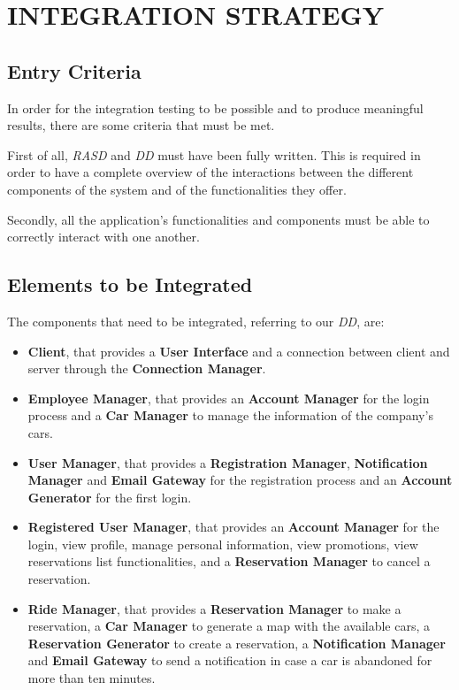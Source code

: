 \section{INTEGRATION STRATEGY}
\label{integrationstrategy}
\subsection{Entry Criteria}
In order for the integration testing to be possible and to produce meaningful results, there are some criteria that  must be met.

First of all, \textit{RASD} and \textit{DD} must have been fully written. This is required in order to have a complete overview of the interactions between the different components of the system and of the functionalities they offer.

Secondly, all the application's functionalities and components must be able to correctly interact with one another. 
   
\subsection{Elements to be Integrated}
The components that need to be  integrated, referring to our \textit{DD}, are:

\begin{itemize}
	\item \textbf{Client}, that provides a \textbf{User Interface} and a connection between client and server through the \textbf{Connection Manager}. 
	\item \textbf{Employee Manager}, that provides an \textbf{Account Manager} for the login process and a \textbf{Car Manager} to manage the information of the company's cars.
	\item \textbf{User Manager}, that provides a \textbf{Registration Manager}, \textbf{Notification Manager} and \textbf{Email Gateway} for the registration process and an \textbf{Account Generator} for the first login.
	\item \textbf{Registered User Manager}, that provides an \textbf{Account Manager} for the login, view profile, manage personal information, view promotions, view reservations list functionalities, and a \textbf{Reservation Manager} to cancel a reservation.
	\item \textbf{Ride Manager}, that provides a \textbf{Reservation Manager} to make a reservation, a \textbf{Car Manager} to generate a map with the available cars, a \textbf{Reservation Generator} to create a reservation, a \textbf{Notification Manager} and \textbf{Email Gateway} to send a notification in case a car is abandoned for more than ten minutes.
\end{itemize}
\newpage
